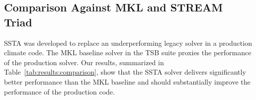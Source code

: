 \documentclass{sig-alternate-05-2015}
\begin{document}

\subsection{Comparison Against MKL and STREAM Triad}
\label{sec:results:comparison}


SSTA was developed to replace an underperforming legacy solver in a production
  climate code.
The MKL baseline solver in the TSB suite proxies the performance of the
  production solver. 
Our results, summarized in Table~\ref{tab:results:comparison}, show that the
  SSTA solver delivers significantly better performance than the MKL baseline
  and should substantially improve the performance of the production code.

\end{document}
